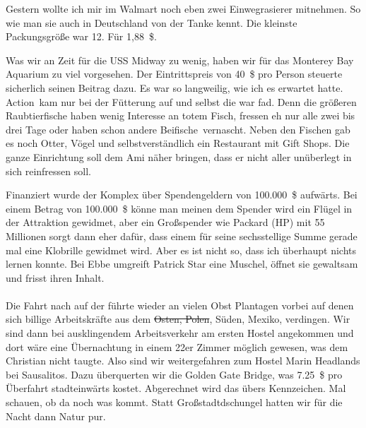 Gestern wollte ich mir im Walmart noch eben zwei Einwegrasierer mitnehmen.
So wie man sie auch in Deutschland von der Tanke kennt.
Die kleinste Packungsgröße war 12.
Für 1,88~\$.

Was wir an Zeit für die USS Midway zu wenig, haben wir für das Monterey Bay Aquarium zu viel vorgesehen.
Der Eintrittspreis von 40~\$ pro Person steuerte sicherlich seinen Beitrag dazu.
Es war so langweilig, wie ich es erwartet hatte.
\glqq Action\grqq \, kam nur bei der Fütterung auf und selbst die war fad.
Denn die größeren Raubtierfische haben wenig Interesse an totem Fisch, fressen eh nur alle zwei bis drei Tage oder haben schon andere \glqq Beifische\grqq \, vernascht.
Neben den Fischen gab es noch Otter, Vögel und selbstverständlich ein Restaurant mit Gift Shops.
Die ganze Einrichtung soll dem Ami näher bringen, dass er nicht aller unüberlegt in sich reinfressen soll.

Finanziert wurde der Komplex über Spendengeldern von 100.000~\$ aufwärts.
Bei einem Betrag von 100.000~\$ könne man meinen dem Spender wird ein Flügel in der Attraktion gewidmet, aber ein Großspender wie Packard (HP) mit 55 Millionen sorgt dann eher dafür, dass einem für seine sechsstellige Summe gerade mal eine Klobrille gewidmet wird.
Aber es ist nicht so, dass ich überhaupt nichts lernen konnte.
Bei Ebbe umgreift Patrick Star eine Muschel, öffnet sie gewaltsam und frisst ihren Inhalt.\\[1em]

\\[1em]

Die Fahrt nach  auf der  führte wieder an vielen Obst Plantagen vorbei auf denen sich billige Arbeitskräfte aus dem \sout{Osten, Polen}, Süden, Mexiko, verdingen.
Wir sind dann bei ausklingendem Arbeitsverkehr am ersten Hostel angekommen und dort wäre eine Übernachtung in einem 22er Zimmer möglich gewesen, was dem Christian nicht taugte.
Also sind wir weitergefahren zum Hostel Marin Headlands bei Sausalitos.
Dazu überquerten wir die Golden Gate Bridge, was 7.25~\$ pro Überfahrt stadteinwärts kostet.
Abgerechnet wird das übers Kennzeichen.
Mal schauen, ob da noch was kommt.
Statt Großstadtdschungel hatten wir für die Nacht dann Natur pur.
